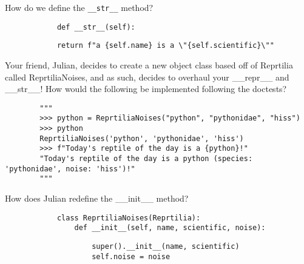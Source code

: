 \begin{blocksection}
    \question How do we define the \lstinline{__str__} method?

    \vspace{1.5\baselineskip}

    \begin{lstlisting}
            def __str__(self):
    \end{lstlisting}
    \begin{solution}[0.25in]
    \begin{lstlisting}
            return f"a {self.name} is a \"{self.scientific}\""
    \end{lstlisting}
    \end{solution}
\end{blocksection}

\begin{blocksection}
    \question Your friend, Julian, decides to create a new object class based off of Reprtilia called ReprtiliaNoises, and as such, decides to overhaul your __repr__ and __str__! How would the following be implemented following the doctests?
    
    \vspace{1.5\baselineskip}

    \begin{lstlisting}
        """
        >>> python = ReprtiliaNoises("python", "pythonidae", "hiss")
        >>> python
        ReprtiliaNoises('python', 'pythonidae', 'hiss')
        >>> f"Today's reptile of the day is a {python}!"
        "Today's reptile of the day is a python (species: 'pythonidae', noise: 'hiss')!"
        """
    \end{lstlisting}

    \begin{blocksection}
        \question How does Julian redefine the __init__ method?
    
        \vspace{1.5\baselineskip}
        
        \begin{lstlisting}
            class ReprtiliaNoises(Reprtilia):
                def __init__(self, name, scientific, noise):
        \end{lstlisting}
        \begin{solution}[0.25in]
        \begin{lstlisting}
                    super().__init__(name, scientific)
                    self.noise = noise
        \end{lstlisting}
        \end{solution}
    \end{blocksection}    
    

\end{blocksection}
